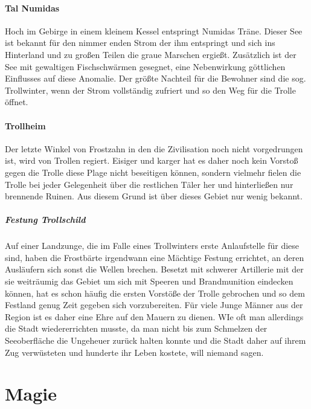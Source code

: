 \documentclass[a4paper,12pt,oneside]{book}
\begin{document}
\subsection{Tal Numidas}
Hoch im Gebirge in einem kleinem Kessel entspringt Numidas Träne. Dieser See ist bekannt für den nimmer enden Strom der ihm entspringt und sich ins Hinterland und zu großen Teilen die graue Marschen ergießt. Zusätzlich ist der See mit gewaltigen Fischschwärmen gesegnet, eine Nebenwirkung göttlichen Einflusses auf diese Anomalie. Der größte Nachteil für die Bewohner sind die sog. Trollwinter, wenn der Strom vollständig zufriert und so den Weg für die Trolle öffnet.
\subsection{Trollheim}
Der letzte Winkel von Frostzahn in den die Zivilisation noch nicht vorgedrungen ist, wird von Trollen regiert. Eisiger und karger hat es daher noch kein Vorstoß gegen die Trolle diese Plage nicht beseitigen können, sondern vielmehr fielen die Trolle bei jeder Gelegenheit über die restlichen Täler her und hinterließen nur brennende Ruinen. Aus diesem Grund ist über dieses Gebiet nur wenig bekannt. 
\subsubsection{Festung Trollschild}
Auf einer Landzunge, die im Falle eines Trollwinters erste Anlaufstelle für diese sind, haben die Frostbärte irgendwann eine Mächtige Festung errichtet, an deren Ausläufern sich sonst die Wellen brechen. Besetzt mit schwerer Artillerie mit der sie weiträumig das Gebiet um sich mit Speeren und Brandmunition eindecken können, hat es schon häufig die ersten Vorstöße der Trolle gebrochen und so dem Festland genug Zeit gegeben sich vorzubereiten. Für viele Junge Männer aus der Region ist es daher eine Ehre auf den Mauern zu dienen. WIe oft man allerdings die Stadt wiedererrichten musste, da man nicht bis zum Schmelzen der Seeoberfläche die Ungeheuer zurück halten konnte und die Stadt daher auf ihrem Zug verwüsteten und hunderte ihr Leben kostete, will niemand sagen.

\part{Magie}
\setcounter{chapter}{0}
\end{document}
